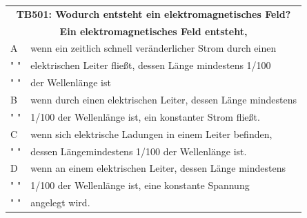 \begin{frame}
	\begin{center}
	\begin{small}
	\begin{tabular}{|l|l|}
		\hline
		\multicolumn{2}{|c|}{\textbf{TB501: Wodurch entsteht ein elektromagnetisches Feld? }}\\
		\multicolumn{2}{|c|}{\textbf{Ein elektromagnetisches Feld entsteht,}}\\
		\hline
		A & wenn ein zeitlich schnell veränderlicher Strom durch einen \\
		" " & elektrischen Leiter fließt, dessen Länge mindestens 1/100 \\
		" " & der Wellenlänge ist \\		
		 \hline
		B & wenn durch einen elektrischen Leiter, dessen Länge mindestens \\
		" " & 1/100 der Wellenlänge ist, ein konstanter Strom fließt. \\ \hline
		C & wenn sich elektrische Ladungen in einem Leiter befinden, \\
		" " & dessen Längemindestens 1/100 der Wellenl\"ange ist. \\ \hline
		D & wenn an einem elektrischen Leiter, dessen Länge mindestens \\
		" " & 1/100 der Wellenlänge ist, eine konstante Spannung \\ 
		" " & angelegt wird. \\ \hline
	\end{tabular}
	\end{small}		
	\end{center}
\end{frame}

